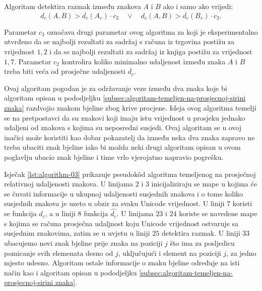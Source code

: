 \documentclass[times, utf8, zavrsni]{fer}
\begin{document}
Algoritam detektira razmak između znakova $A$ i $B$ ako i samo ako vrijedi:
\begin{equation}
\label{eq:relative-distance-03}
    d_c(A, B) > \overline{d_c}(A_v) \cdot c_2 \quad \lor \quad
    d_c(A, B) > \overline{d_c}(B_v) \cdot c_2 \texttt{.}
\end{equation}

Parametar $c_2$ označava drugi parametar ovog algoritma za koji je
eksperimentalno utvrđeno da se najbolji rezultati za sadržaj s računa iz
trgovina postižu za vrijednost $1{,}2$ i da se najbolji rezultati za sadržaj iz
knjiga postižu za vrijednost $1{,}7$. Parametar $c_2$ kontrolira koliko
minimalno udaljenost između znaka $A$ i $B$ treba biti veća od prosječne
udaljenosti $\overline{d_c}$.

Ovaj algoritam pogodan je za održavanje veze između dva znaka koje bi
algoritam opisan u pododjeljku
\ref{subsec:algoritam-temeljen-na-prosjecnoj-sirini znaka} razdvojio znakom
bjeline zbog krive procjene. Ideja ovog algoritma temelji se na
pretpostavci da su znakovi koji imaju istu vrijednost u prosjeku jednako
udaljeni od znakova s kojima su neposredni susjedi. Ovaj algoritam se u ovoj
inačici može koristiti kao dobar pokazatelj da između neka dva znaka zapravo
ne treba ubaciti znak bjeline iako bi možda neki drugi algoritam opisan u ovom
poglavlju ubacio znak bjeline i time vrlo vjerojatno napravio pogrešku.

Isječak \ref{lst:algorithm-03} prikazuje pseudokôd algoritma temeljenog na
prosječnoj relativnoj udaljenosti znakova. U linijama $2$ i $3$ inicijaliziraju
se mape u kojima će se čuvati informacije u ukupnoj udaljenosti susjednih
znakova i o tome koliko susjednih znakova je uzeto u obzir za svaku Unicode
vrijednost. U liniji $7$ koristi se funkcija $d_c$, a u liniji $8$ funkcija
$\hat{d_c}$. U linijama $23$ i $24$ koriste se navedene mape s kojima se računa
prosječna udaljnost koju Unicode vrijednost ostvaruje sa susjednim znakovima,
zatim se u uvjetu u liniji $25$ detektira razmak. U liniji $33$
ubacujemo novi znak bjeline prije znaka na poziciji $j$ što ima za posljedicu
pomicanje svih elemenata desno od $j$, uključujući i element na poziciji $j$,
za jedno mjesto udesno. Algoritam ostale informacije o znaku bjeline
određuje na isti način kao i algoritam opisan u pododjeljku
\ref{subsec:algoritam-temeljen-na-prosjecnoj-sirini znaka}.
\end{document}
